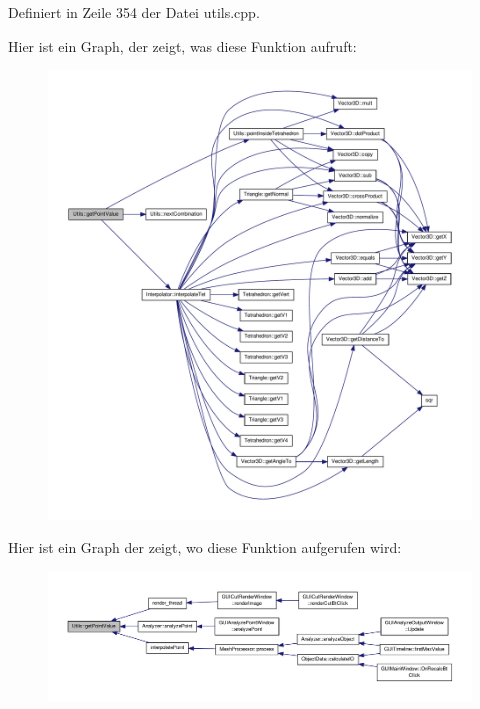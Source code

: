 Definiert in Zeile 354 der Datei utils.\-cpp.



Hier ist ein Graph, der zeigt, was diese Funktion aufruft\-:\nopagebreak
\begin{figure}[H]
\begin{center}
\leavevmode
\includegraphics[width=350pt]{namespaceUtils_a6a0ae18a42e2d206bc1b43da27820fe2_cgraph}
\end{center}
\end{figure}




Hier ist ein Graph der zeigt, wo diese Funktion aufgerufen wird\-:\nopagebreak
\begin{figure}[H]
\begin{center}
\leavevmode
\includegraphics[width=350pt]{namespaceUtils_a6a0ae18a42e2d206bc1b43da27820fe2_icgraph}
\end{center}
\end{figure}


